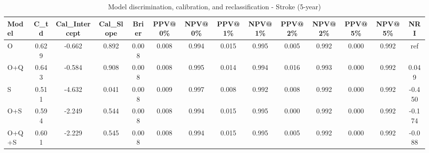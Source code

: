 \begin{table}[htbp]
\centering
\small
\caption{Model discrimination, calibration, and reclassification - Stroke (5-year)}
\label{tab:perf_stroke_5y}
\begin{tabular}{lccccccccccccc}
\toprule
Model & C\_td & Cal\_Intercept & Cal\_Slope & Brier & PPV@0\% & NPV@0\% & PPV@1\% & NPV@1\% & PPV@2\% & NPV@2\% & PPV@5\% & NPV@5\% & NRI \\
\midrule
O & 0.629 & -0.662 & 0.892 & 0.008 & 0.008 & 0.994 & 0.015 & 0.995 & 0.005 & 0.992 & 0.000 & 0.992 & ref \\
O+Q & 0.643 & -0.584 & 0.908 & 0.008 & 0.008 & 0.995 & 0.014 & 0.994 & 0.016 & 0.993 & 0.000 & 0.992 & 0.049 \\
S & 0.511 & -4.632 & 0.041 & 0.008 & 0.009 & 0.997 & 0.008 & 0.992 & 0.008 & 0.992 & 0.000 & 0.992 & -0.450 \\
O+S & 0.594 & -2.249 & 0.544 & 0.008 & 0.008 & 0.994 & 0.015 & 0.995 & 0.000 & 0.992 & 0.000 & 0.992 & -0.174 \\
O+Q+S & 0.601 & -2.229 & 0.545 & 0.008 & 0.008 & 0.994 & 0.015 & 0.995 & 0.005 & 0.992 & 0.000 & 0.992 & -0.088 \\
\bottomrule
\end{tabular}
\end{table}